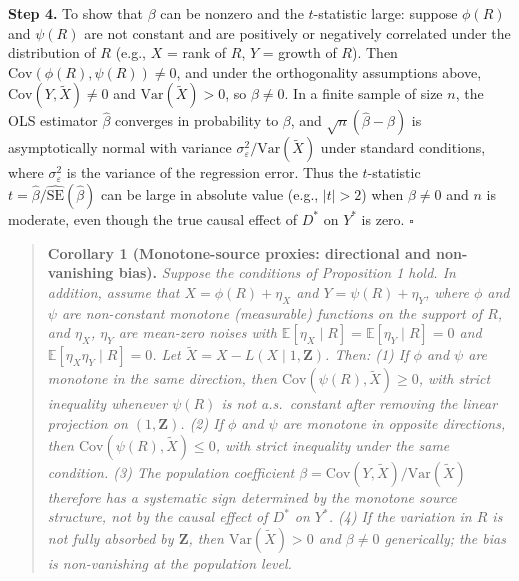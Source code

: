 \textbf{Step 4.} To show that $\beta$ can be nonzero and the $t$-statistic large: suppose $\phi(R)$ and $\psi(R)$ are not constant and are positively or negatively correlated under the distribution of $R$ (e.g., $X$ = rank of $R$, $Y$ = growth of $R$). Then $\mathrm{Cov}(\phi(R), \psi(R)) \neq 0$, and under the orthogonality assumptions above, $\mathrm{Cov}(Y, \tilde{X}) \neq 0$ and $\mathrm{Var}(\tilde{X}) > 0$, so $\beta \neq 0$. In a finite sample of size $n$, the OLS estimator $\hat{\beta}$ converges in probability to $\beta$, and $\sqrt{n}(\hat{\beta} - \beta)$ is asymptotically normal with variance $\sigma^2_\varepsilon / \mathrm{Var}(\tilde{X})$ under standard conditions, where $\sigma^2_\varepsilon$ is the variance of the regression error. Thus the $t$-statistic $t = \hat{\beta} / \widehat{\mathrm{SE}}(\hat{\beta})$ can be large in absolute value (e.g., $|t| > 2$) when $\beta \neq 0$ and $n$ is moderate, even though the true causal effect of $D^*$ on $Y^*$ is zero. \hfill $\square$

\begin{quote}
\textbf{Corollary 1 (Monotone-source proxies: directional and non-vanishing bias).} \textit{Suppose the conditions of Proposition 1 hold. In addition, assume that $X = \phi(R) + \eta_X$ and $Y = \psi(R) + \eta_Y$, where $\phi$ and $\psi$ are non-constant monotone (measurable) functions on the support of $R$, and $\eta_X$, $\eta_Y$ are mean-zero noises with $\mathbb{E}[\eta_X \mid R] = \mathbb{E}[\eta_Y \mid R] = 0$ and $\mathbb{E}[\eta_X \eta_Y \mid R] = 0$. Let $\tilde{X} = X - L(X \mid 1, \mathbf{Z})$. Then: (1) If $\phi$ and $\psi$ are monotone in the same direction, then $\mathrm{Cov}(\psi(R), \tilde{X}) \geq 0$, with strict inequality whenever $\psi(R)$ is not a.s.\ constant after removing the linear projection on $(1, \mathbf{Z})$. (2) If $\phi$ and $\psi$ are monotone in opposite directions, then $\mathrm{Cov}(\psi(R), \tilde{X}) \leq 0$, with strict inequality under the same condition. (3) The population coefficient $\beta = \mathrm{Cov}(Y, \tilde{X}) / \mathrm{Var}(\tilde{X})$ therefore has a systematic sign determined by the monotone source structure, not by the causal effect of $D^*$ on $Y^*$. (4) If the variation in $R$ is not fully absorbed by $\mathbf{Z}$, then $\mathrm{Var}(\tilde{X}) > 0$ and $\beta \neq 0$ generically; the bias is non-vanishing at the population level.}
\end{quote}

